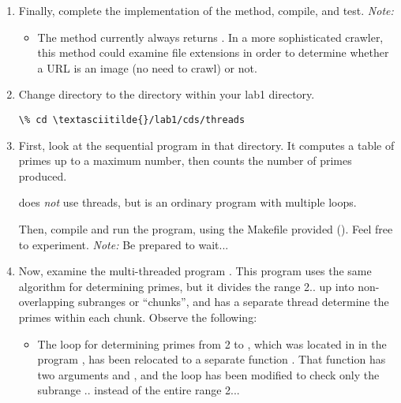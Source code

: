 \documentclass[letterpaper,10pt,openany,oneside]{sphinxmanual}
\begin{document}
\begin{enumerate}
\begin{itemize}
\end{itemize}

\item {} 
Finally, complete the implementation of the 
method, compile, and test. \emph{Note:}
\begin{itemize}
\item {} 
The method  currently always returns
. In a more sophisticated crawler, this method could
examine file extensions in order to determine whether a URL is an
image (no need to crawl) or not.

\end{itemize}

\item {} 
Change directory to the  directory within your lab1
directory.

\begin{Verbatim}[commandchars=\\\{\}]
\% cd \textasciitilde{}/lab1/cds/threads
\end{Verbatim}

\item {} 
First, look at the sequential program  in that
directory. It computes a table of primes up to a maximum number, then
counts the number of primes produced.

 does \emph{not} use threads, but is an ordinary program
with multiple loops.

Then, compile and run the program, using the Makefile provided
(). Feel free to experiment. \emph{Note:} Be prepared to
wait...

\item {} 
Now, examine the multi-threaded program . This
program uses the same algorithm for determining primes, but it
divides the range 2.. up into  non-overlapping
subranges or ``chunks'', and has a separate  thread determine
the primes within each chunk. Observe the following:
\begin{itemize}
\item {} 
The loop for determining primes from 2 to , which was
located in  in the program , has been
relocated to a separate function . That function has two
arguments  and , and the loop has been modified to
check only the subrange .. instead of the entire
range 2...


\end{itemize}
\end{enumerate}
\end{document}
